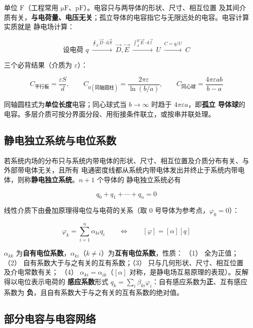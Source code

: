 单位 $\mathrm{F}$（工程常用 $\mathrm{\mu F}$、$\mathrm{pF}$）。电容只与两导体的形状、尺寸、相互位置
及其间介质有关，\textbf{与电荷量、电压无关}；孤立导体的电容指它与无限远处的电容。电容计算实质就是
静电场计算：
\begin{formulaBox}
\[
\text{设电荷 }q\ \xrightarrow{\oint_S\vec{D}\cdot\mathrm{d}\vec{S}}\ \vec{D},\vec{E}
\ \xrightarrow{\int_A^B\vec{E}\cdot\mathrm{d}\vec{l}}\ U
\ \xrightarrow{C=q/U}\ C
\]
\end{formulaBox}

三个必背结果（介质为 $\varepsilon$）：
\begin{formulaBox}
\[
C_{\text{平行板}}=\frac{\varepsilon S}{d},
\qquad
C_{0(\text{同轴圆柱})}=\frac{2\pi\varepsilon}{\ln(b/a)},
\qquad
C_{\text{同心球}}=\frac{4\pi\varepsilon ab}{b-a}
\]
\end{formulaBox}

同轴圆柱式为\textbf{单位长度}电容；同心球式当 $b\to\infty$ 时趋于 $4\pi\varepsilon a$，即\textbf{孤立
导体球}的电容。多层介质可按分界面分段、用衔接条件联立，或按串并联处理。

\subsection{静电独立系统与电位系数}

若系统内场的分布只与系统内带电体的形状、尺寸、相互位置及介质分布有关、与外部带电体无关，且所有
电通密度线都从系统内带电体发出并终止于系统内带电体，则称\textbf{静电独立系统}。$n+1$ 个导体的
静电独立系统必有
\begin{formulaBox}
\[
q_0+q_1+\cdots+q_n=0
\]
\end{formulaBox}

线性介质下由叠加原理得电位与电荷的关系（取 0 号导体为参考点，$\varphi_0=0$）：
\begin{formulaBox}
\[
\varphi_k=\sum_{i=1}^{n}\alpha_{ki}q_i
\qquad\Longleftrightarrow\qquad
[\varphi]=[\alpha][q]
\]
\end{formulaBox}

$\alpha_{kk}$ 为\textbf{自有电位系数}，$\alpha_{ki}$（$k\neq i$）为\textbf{互有电位系数}，性质：
（1） 全为正值；（2） 自有系数大于与之有关的互有系数；（3） 只与几何形状、尺寸、相互位置及介电常数有关；
（4） $\alpha_{ki}=\alpha_{ik}$（$[\alpha]$ 对称，是静电场互易原理的表现）。反解得以电位表示电荷的
\textbf{感应系数}形式 $q_k=\sum_i\beta_{ki}\varphi_i$：自有感应系数为\textbf{正}、互有感应系数为
\textbf{负}，且自有系数大于与之有关的互有系数的绝对值。

\subsection{部分电容与电容网络}

